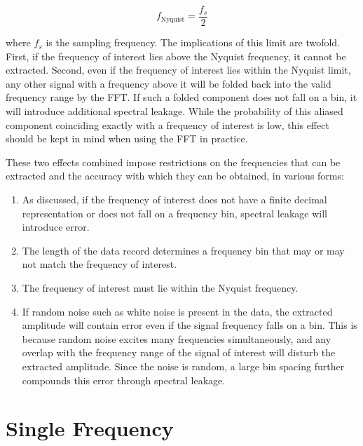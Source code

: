 \documentclass[a4paper, 12pt]{report}
\begin{document}
\begin{equation}
    f_{\text{Nyquist}} = \frac{f_s}{2}
\end{equation}

where $f_s$ is the sampling frequency. The implications of this limit are twofold. First, if
the frequency of interest lies above the Nyquist frequency, it cannot be extracted. Second,
even if the frequency of interest lies within the Nyquist limit, any other signal with a
frequency above it will be folded back into the valid frequency range by the FFT. If such a
folded component does not fall on a bin, it will introduce additional spectral leakage. While
the probability of this aliased component coinciding exactly with a frequency of interest is
low, this effect should be kept in mind when using the FFT in practice.

These two effects combined impose restrictions on the frequencies that can be extracted and
the accuracy with which they can be obtained, in various forms:

\begin{enumerate}
    \item As discussed, if the frequency of interest does not have a finite decimal
          representation or does not fall on a frequency bin, spectral leakage will introduce
          error.
    \item The length of the data record determines a frequency bin that may or may not match
          the frequency of interest.
    \item The frequency of interest must lie within the Nyquist frequency.
    \item If random noise such as white noise is present in the data, the extracted amplitude
          will contain error even if the signal frequency falls on a bin. This is because random
          noise excites many frequencies simultaneously, and any overlap with the frequency range
          of the signal of interest will disturb the extracted amplitude. Since the noise is
          random, a large bin spacing further compounds this error through spectral leakage.
\end{enumerate}

\vspace{0.5cm}

\section{Single Frequency}
\end{document}
